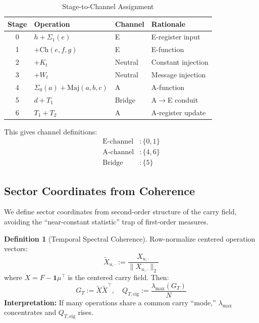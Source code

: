 \documentclass[11pt,a4paper]{article}
\theoremstyle{plain}
\theoremstyle{definition}
\newtheorem{definition}[theorem]{Definition}
\theoremstyle{remark}
\newcommand{\Maj}{\mathrm{Maj}}
\newcommand{\Ch}{\mathrm{Ch}}
\newcommand{\Qteig}{Q_{T,\mathrm{eig}}}
\begin{document}
\begin{table}[h]
\centering
\caption{Stage-to-Channel Assignment}
\label{tab:channels}
\begin{tabular}{clll}
\toprule
Stage & Operation & Channel & Rationale \\
\midrule
0 & $h + \Sigma_1(e)$ & E & E-register input \\
1 & $+ \Ch(e,f,g)$ & E & E-function \\
2 & $+ K_t$ & Neutral & Constant injection \\
3 & $+ W_t$ & Neutral & Message injection \\
4 & $\Sigma_0(a) + \Maj(a,b,c)$ & A & A-function \\
5 & $d + T_1$ & Bridge & A$\to$E conduit \\
6 & $T_1 + T_2$ & A & A-register update \\
\bottomrule
\end{tabular}
\end{table}

This gives channel definitions:
\begin{align}
    \text{E-channel} &: \{0, 1\} \\
    \text{A-channel} &: \{4, 6\} \\
    \text{Bridge} &: \{5\}
\end{align}

\subsection{Sector Coordinates from Coherence}

We define sector coordinates from second-order structure of the carry field, avoiding the ``near-constant statistic'' trap of first-order measures.

\begin{definition}[Temporal Spectral Coherence]
Row-normalize centered operation vectors:
\begin{equation}
    \tilde{X}_{u,\cdot} := \frac{X_{u,\cdot}}{\|X_{u,\cdot}\|_2}
\end{equation}
where $X = F - \mathbf{1}\mu^\top$ is the centered carry field. Then:
\begin{equation}
    G_T := \tilde{X}\tilde{X}^\top, \quad \Qteig := \frac{\lambda_{\max}(G_T)}{N}
\end{equation}
\textbf{Interpretation:} If many operations share a common carry ``mode,'' $\lambda_{\max}$ concentrates and $\Qteig$ rises.
\end{definition}
\end{document}
